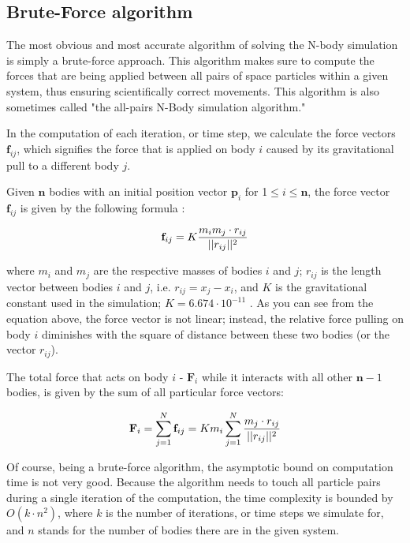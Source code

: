 \documentclass[journal]{IEEEtran}
\begin{document}
	\subsection*{Brute-Force algorithm}
		The most obvious and most accurate algorithm of solving the N-body simulation is simply a brute-force approach. This algorithm makes sure to compute the forces that are being applied between all pairs of space particles within a given system, thus ensuring scientifically correct movements. This algorithm is also sometimes called "the all-pairs N-Body simulation algorithm."
		
		In the computation of each iteration, or time step, we calculate the force vectors $\textbf{f}_{ij}$, which signifies the force that is applied on body $i$ caused by its gravitational pull to a different body $j$. 
		
		Given $\textbf{n}$ bodies with an initial position vector $\textbf{p}_{i}$ for 1$ \leq i \leq \textbf{n}$, the force vector $\textbf{f}_{ij}$ is given by the following formula \cite{nvidia-article}:
		
		\begin{equation}
		\centering
			\textbf{f}_{ij} = K \frac{m_i m_j \cdot r_{ij}}{||r_{ij}||^2} 
		\end{equation}
		
		where $m_i$ and $m_j$ are the respective masses of bodies $i$ and $j$; $r_{ij}$ is the length vector between bodies $i$ and $j$, i.e. $r_{ij} = x_j - x_i$, and $K$ is the gravitational constant used in the simulation; $K = 6.674 \cdot 10^{-11}$ \cite{constant}. As you can see from the equation above, the force vector is not linear; instead, the relative force pulling on body $i$ diminishes with the square of distance between these two bodies (or the vector $r_{ij}$).
		
		The total force that acts on body $i$ - $\textbf{F}_i$ while it interacts with all other $\textbf{n}-1$ bodies, is given by the sum of all particular force vectors:
		
		\begin{equation}
		\centering
			\textbf{F}_i = \sum_{j = 1}^{N}\textbf{f}_{ij}
			 = K m_i \sum_{j = 1}^{N}{\frac{m_j \cdot r_{ij}}{||r_{ij}||^2}}
		\end{equation}
		
		Of course, being a brute-force algorithm, the asymptotic bound on computation time is not very good. Because the algorithm needs to touch all particle pairs during a single iteration of the computation, the time complexity is bounded by $O(k \cdot n^2)$, where $k$ is the number of iterations, or time steps we simulate for, and $n$ stands for the number of bodies there are in the given system.
	
\end{document}
